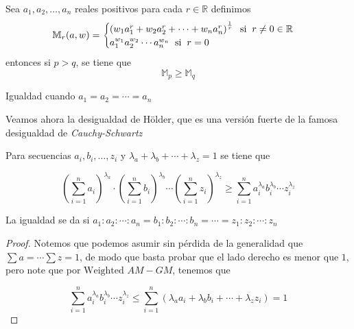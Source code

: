 \documentclass[11pt]{scrartcl}
\begin{document}
\begin{theorem}
    \label{Weighted Power Mean Inequality}

    Sea $a_1,a_2,\ldots,a_n$ reales positivos para cada $r\in \mathbb{R}$ definimos\[\mathbb{M}_r(a,w)
        =\begin{cases}\left(w_1a_1^r+w_2a_2^r+\cdots+w_na_n^r\right)^\frac{1}{r} \hspace{0.2cm} \text{si} \hspace{0.2cm}r\neq 0\in\mathbb{R} \\ a_1^{w_1}a_2^{w_2}\cdots a_n^{w_n}\hspace{0.2cm} \text{si}\hspace{0.2cm} r=0 \end{cases}\] entonces si $p>q$, se tiene que
    \[ \mathbb{M}_p\geq \mathbb{M}_q\]

    Igualdad cuando $a_1=a_2=\cdots=a_n$

    
\end{theorem}

Veamos ahora la desigualdad de Hölder, que es una versión fuerte de la famosa desigualdad de \textit{Cauchy-Schwartz}

\begin{theorem}\label{Holder}
Para secuencias $a_i,b_i,\ldots, z_i$ y $\lambda_{a}+\lambda_{b}+\cdots+\lambda_{z}=1$ se tiene que

\[\left(\sum_{i=1}^n a_i\right)^{\lambda_{a}}\cdot \left(\sum_{i=1}^n b_i\right)^{\lambda_{b}}\cdots \left(\sum_{i=1}^n z_i\right)^{\lambda_{z}} \geq \sum_{i=1}^n a_i^{\lambda_{a}}b_i^{\lambda_{b}}\cdots z_i^{\lambda_{z}}\]

La igualdad se da si $a_1:a_2:\cdots :a_n=b_1:b_2:\cdots :b_n=\cdots=z_1:z_2:\cdots :z_n$

\end{theorem}
\begin{proof}
    Notemos que podemos asumir sin pérdida de la generalidad que $\sum a=\cdots \sum z=1$, de modo que basta probar que el lado derecho es menor que $1$, pero note que por $\hyperref[Weighted AM-GM]{\text{Weighted $AM-GM$}}$, tenemos que

    \[ \sum_{i=1}^n a_i^{\lambda_{a}}b_i^{\lambda_{b}}\cdots z_i^{\lambda_{z}} \leq \sum_{i=1}^n (\lambda_{a} a_i+\lambda_{b} b_i+\cdots+\lambda_{z} z_i)=1\]
    
\end{proof}
\end{document}
